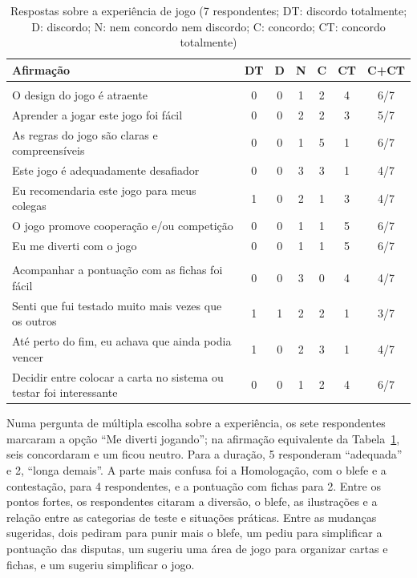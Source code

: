 \begin{table}[ht]
  \centering
  \caption{Respostas sobre a experiência de jogo (7 respondentes; DT: discordo totalmente; D: discordo; N: nem
    concordo nem discordo; C: concordo; CT: concordo totalmente)}
  \label{tab:playtest}
  \scriptsize
  \begin{tabularx}{\linewidth}{>{\raggedright\arraybackslash}X c c c c c c}
    \toprule
    Afirmação & DT & D & N & C & CT & C+CT \\
    \midrule
    \multicolumn{7}{l}{\textit{Sobre o jogo}} \\
    O design do jogo é atraente & 0 & 0 & 1 & 2 & 4 & 6/7 \\
    Aprender a jogar este jogo foi fácil & 0 & 0 & 2 & 2 & 3 & 5/7 \\
    As regras do jogo são claras e compreensíveis & 0 & 0 & 1 & 5 & 1 & 6/7 \\
    Este jogo é adequadamente desafiador & 0 & 0 & 3 & 3 & 1 & 4/7 \\
    Eu recomendaria este jogo para meus colegas & 1 & 0 & 2 & 1 & 3 & 4/7 \\
    O jogo promove cooperação e/ou competição & 0 & 0 & 1 & 1 & 5 & 6/7 \\
    Eu me diverti com o jogo & 0 & 0 & 1 & 1 & 5 & 6/7 \\
    \midrule
    \multicolumn{7}{l}{\textit{Sobre as regras}} \\
    Acompanhar a pontuação com as fichas foi fácil & 0 & 0 & 3 & 0 & 4 & 4/7 \\
    Senti que fui testado muito mais vezes que os outros & 1 & 1 & 2 & 2 & 1 & 3/7 \\
    Até perto do fim, eu achava que ainda podia vencer & 1 & 0 & 2 & 3 & 1 & 4/7 \\
    Decidir entre colocar a carta no sistema ou testar foi interessante & 0 & 0 & 1 & 2 & 4 & 6/7 \\
    \bottomrule
  \end{tabularx}
\end{table}

Numa pergunta de múltipla escolha sobre a experiência, os sete respondentes marcaram a opção ``Me
diverti jogando''; na afirmação equivalente da Tabela~\ref{tab:playtest}, seis concordaram e um ficou neutro.
Para a duração, 5 responderam ``adequada'' e 2, ``longa
demais''. A parte mais confusa foi a Homologação, com o blefe e a contestação, para 4 respondentes, e a pontuação
com fichas para 2. Entre os pontos fortes, os respondentes citaram a diversão, o blefe, as ilustrações e a relação
entre as categorias de teste e situações práticas. Entre as mudanças sugeridas, dois pediram para punir mais o
blefe, um pediu para simplificar a pontuação das disputas, um sugeriu uma área de jogo para organizar cartas e
fichas, e um sugeriu simplificar o jogo.

